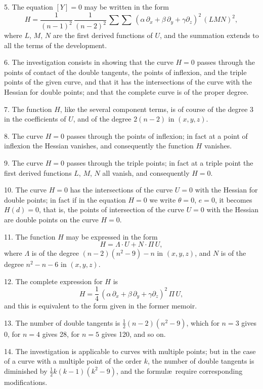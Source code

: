 \documentclass[11pt,a4paper]{book}
\begin{document}
5. The equation $[Y]=0$ may be written in the form
\[
H = \frac{1}{(n-1)^2}\,\frac{1}{(n-2)^2}\,\sum\sum\,(\alpha\,\partial_x + \beta\,\partial_y + \gamma\partial_z)^2\, (LMN)^2,
\]
where $L$, $M$, $N$ are the first derived functions of $U$, and the summation extends to all the terms of the development.

6. The investigation consists in showing that the curve $H=0$ passes through the points of contact of the double tangents, the points of inflexion, and the triple points of the given curve, and that it has the intersections of the curve with the Hessian for double points; and that the complete curve is of the proper degree.

7. The function $H$, like the several component terms, is of course of the degree 3 in the coefficients of $U$, and of the degree $2(n-2)$ in $(x, y, z)$.

8. The curve $H=0$ passes through the points of inflexion; in fact at a point of inflexion the Hessian vanishes, and consequently the function $H$ vanishes.

9. The curve $H=0$ passes through the triple points; in fact at a triple point the first derived functions $L$, $M$, $N$ all vanish, and consequently $H=0$.

10. The curve $H=0$ has the intersections of the curve $U=0$ with the Hessian for double points; in fact if in the equation $H=0$ we write $\theta=0$, $e=0$, it becomes $H(d)=0$, that is, the points of intersection of the curve $U=0$ with the Hessian are double points on the curve $H=0$.

11. The function $H$ may be expressed in the form
\[
H = \Lambda \cdot U + N \cdot \Pi\,U,
\]
where $\Lambda$ is of the degree $(n-2)(n^2-9)-n$ in $(x, y, z)$, and $N$ is of the degree $n^2-n-6$ in $(x, y, z)$.

12. The complete expression for $H$ is
\[
H = \frac{1}{4}\,(\alpha\,\partial_x + \beta\,\partial_y + \gamma\partial_z)^2\, \Pi\,U,
\]
and this is equivalent to the form given in the former memoir.

13. The number of double tangents is $\frac{1}{2}(n-2)(n^2-9)$, which for $n=3$ gives 0, for $n=4$ gives 28, for $n=5$ gives 120, and so on.

14. The investigation is applicable to curves with multiple points; but in the case of a curve with a multiple point of the order $k$, the number of double tangents is diminished by $\frac{1}{2}k(k-1)(k^2-9)$, and the formul\ae\ require corresponding modifications.
\end{document}
